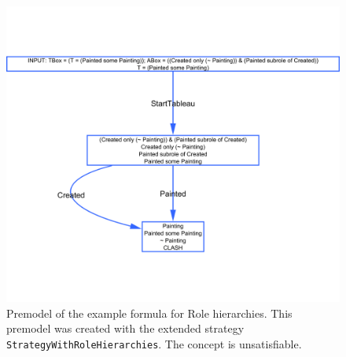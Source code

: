 \documentclass[11pt]{article} %
\begin{document}
\begin{figure}
\begin{center}
\includegraphics[scale=0.4]{premodelmetsubrole}
\caption{Premodel of the example formula for Role hierarchies. This premodel was created with the extended strategy \texttt{StrategyWithRoleHierarchies}. The concept is unsatisfiable.}
\label{fig:metsubrole}
\end{center}
\end{figure}

%
%
\end{document}

